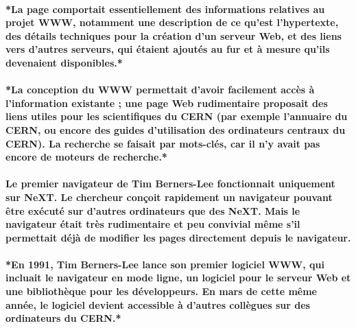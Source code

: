 \paragraph{
  *La page comportait essentiellement des informations relatives au projet WWW, notamment une description de ce qu'est l'hypertexte, des détails techniques pour la création d'un serveur Web, et des liens vers d'autres serveurs, qui étaient ajoutés au fur et à mesure qu'ils devenaient disponibles.*
}

\paragraph{
  *La conception du WWW permettait d'avoir facilement accès à l'information existante ; une page Web rudimentaire proposait des liens utiles pour les scientifiques du CERN (par exemple l'annuaire du CERN, ou encore des guides d'utilisation des ordinateurs centraux du CERN). La recherche se faisait par mots-clés, car il n'y avait pas encore de moteurs de recherche.*
}

\paragraph{
  Le premier navigateur de Tim Berners-Lee fonctionnait uniquement sur NeXT. Le chercheur conçoit rapidement un navigateur pouvant être exécuté sur d'autres ordinateurs que des NeXT. Mais le navigateur était très rudimentaire et peu convivial même s'il permettait déjà de modifier les pages directement depuis le navigateur.
}

\paragraph{
  *En 1991, Tim Berners-Lee lance son premier logiciel WWW, qui incluait le navigateur en mode ligne, un logiciel pour le serveur Web et une bibliothèque pour les développeurs. En mars de cette même année, le logiciel devient accessible à d'autres collègues sur des ordinateurs du CERN.*
}


